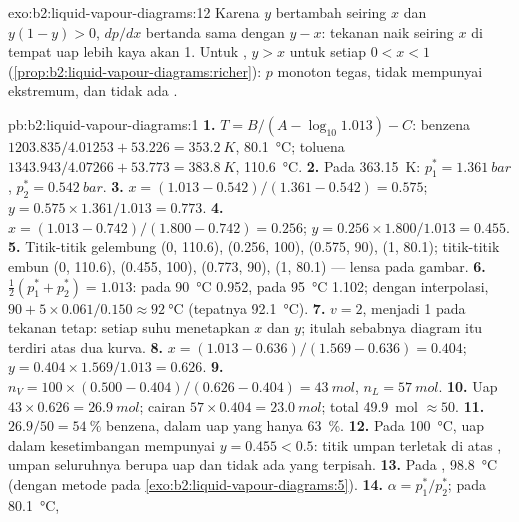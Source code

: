 \begin{solution}{exo:b2:liquid-vapour-diagrams:12}
Karena $y$ bertambah seiring $x$ dan $y(1 - y) > 0$, $dp/dx$ bertanda sama
dengan $y - x$: tekanan naik seiring $x$ di tempat uap lebih kaya akan 1.
Untuk , $y > x$ untuk setiap $0 < x < 1$
(\cref{prop:b2:liquid-vapour-diagrams:richer}): $p$ monoton tegas, tidak
mempunyai ekstremum, dan tidak ada .
\end{solution}

\begin{solution}{pb:b2:liquid-vapour-diagrams:1}
\textbf{1.} $T = B/(A - \log_{10}1.013) - C$: benzena $1203.835/4.01253 + 53.226 =
\qty{353.2}{K}$, \qty{80.1}{\degreeCelsius}; toluena $1343.943/4.07266 + 53.773 =
\qty{383.8}{K}$, \qty{110.6}{\degreeCelsius}.
\textbf{2.} Pada \qty{363.15}{K}: $p_1^* = \qty{1.361}{bar}$,
$p_2^* = \qty{0.542}{bar}$.
\textbf{3.} $x = (1.013 - 0.542)/(1.361 - 0.542) = 0.575$; $y = 0.575 \times
1.361/1.013 = 0.773$.
\textbf{4.} $x = (1.013 - 0.742)/(1.800 - 0.742) = 0.256$; $y = 0.256 \times
1.800/1.013 = 0.455$.
\textbf{5.} Titik-titik gelembung (0, 110.6), (0.256, 100), (0.575, 90),
(1, 80.1); titik-titik embun (0, 110.6), (0.455, 100), (0.773, 90),
(1, 80.1) --- lensa pada gambar.
\textbf{6.} $\frac12(p_1^* + p_2^*) = 1.013$: pada \qty{90}{\degreeCelsius}
0.952, pada \qty{95}{\degreeCelsius} 1.102; dengan interpolasi,
$90 + 5 \times 0.061/0.150 \approx
\qty{92}{\degreeCelsius}$
(tepatnya \qty{92.1}{\degreeCelsius}).
\textbf{7.} $v = 2$, menjadi 1 pada tekanan tetap: setiap suhu menetapkan
$x$ dan $y$; itulah sebabnya diagram itu terdiri atas dua kurva.
\textbf{8.} $x = (1.013 - 0.636)/(1.569 - 0.636) = 0.404$; $y = 0.404 \times
1.569/1.013 = 0.626$.
\textbf{9.} $n_V = 100 \times (0.500 - 0.404)/(0.626 - 0.404) = \qty{43}{mol}$,
$n_L = \qty{57}{mol}$.
\textbf{10.} Uap $43 \times 0.626 = \qty{26.9}{mol}$; cairan $57 \times 0.404
= \qty{23.0}{mol}$; total \qty{49.9}{mol} $\approx 50$.
\textbf{11.} $26.9/50 = 54~\%$ benzena, dalam uap yang hanya 63~\%.
\textbf{12.} Pada \qty{100}{\degreeCelsius}, uap dalam kesetimbangan
mempunyai $y =
0.455 < 0.5$: titik umpan terletak di atas ,
umpan seluruhnya berupa uap dan tidak ada yang terpisah.
\textbf{13.} Pada , \qty{98.8}{\degreeCelsius} (dengan metode
pada \cref{exo:b2:liquid-vapour-diagrams:5}).
\textbf{14.} $\alpha = p_1^*/p_2^*$; pada \qty{80.1}{\degreeCelsius},

\end{solution}
